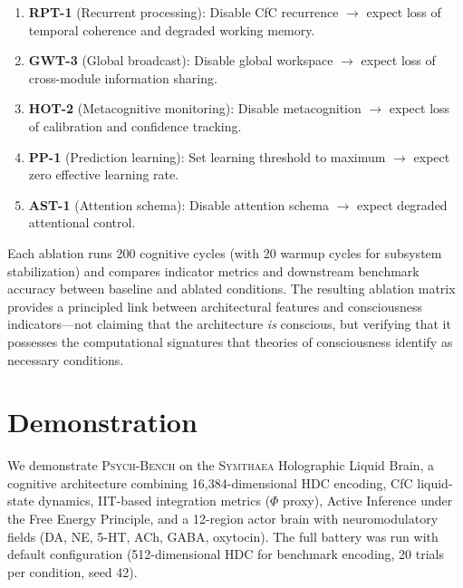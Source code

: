 \documentclass[11pt,letterpaper]{article}
\newcommand{\symthaea}{\textsc{Symthaea}}
\newcommand{\psychbench}{\textsc{Psych-Bench}}
\begin{document}
\begin{enumerate}[nosep]
    \item \textbf{RPT-1} (Recurrent processing): Disable CfC recurrence $\to$ expect loss of temporal coherence and degraded working memory.
    \item \textbf{GWT-3} (Global broadcast): Disable global workspace $\to$ expect loss of cross-module information sharing.
    \item \textbf{HOT-2} (Metacognitive monitoring): Disable metacognition $\to$ expect loss of calibration and confidence tracking.
    \item \textbf{PP-1} (Prediction learning): Set learning threshold to maximum $\to$ expect zero effective learning rate.
    \item \textbf{AST-1} (Attention schema): Disable attention schema $\to$ expect degraded attentional control.
\end{enumerate}

Each ablation runs 200 cognitive cycles (with 20 warmup cycles for subsystem stabilization) and compares indicator metrics and downstream benchmark accuracy between baseline and ablated conditions. The resulting ablation matrix provides a principled link between architectural features and consciousness indicators---not claiming that the architecture \emph{is} conscious, but verifying that it possesses the computational signatures that theories of consciousness identify as necessary conditions.

\section{Demonstration}
\label{sec:demonstration}

We demonstrate \psychbench{} on the \symthaea{} Holographic Liquid Brain, a cognitive architecture combining 16,384-dimensional HDC encoding, CfC liquid-state dynamics, IIT-based integration metrics ($\Phi$ proxy), Active Inference under the Free Energy Principle, and a 12-region actor brain with neuromodulatory fields (DA, NE, 5-HT, ACh, GABA, oxytocin). The full battery was run with default configuration (512-dimensional HDC for benchmark encoding, 20 trials per condition, seed 42).
\end{document}
